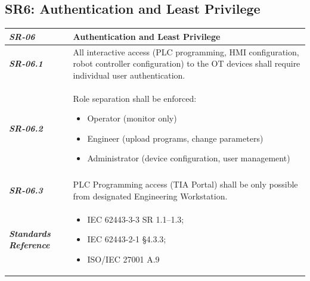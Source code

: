 \documentclass[11pt,a4paper]{article}
\begin{document}
\subsection{SR6: Authentication and Least Privilege}\label{SR6}
\begin{tabularx}{\textwidth}{>{\bfseries}p{2.5cm} X}
    \textit{SR-06} & \textbf{Authentication and Least Privilege} \vspace{0.5em}\\
\toprule
\textit{SR-06.1} &
    All interactive access (PLC programming, HMI configuration, robot controller configuration) to the OT devices shall require individual user authentication.
    \vspace{0.5em}
\\
\textit{SR-06.2} &
    Role separation shall be enforced:
    \begin{itemize}[label=-, noitemsep, topsep=0pt, leftmargin=*]
        \item Operator (monitor only)
        \item Engineer (upload programs, change parameters)
        \item Administrator (device configuration, user management)
    \end{itemize} \vspace{1em} \\ 
    \vspace{0.5em}
    \\
\textit{SR-06.3} &
    PLC Programming access (TIA Portal) shall be only possible from designated Engineering Workstation.
    \vspace{0.5em}
    \\
\midrule
    \textit{Standards Reference} &
\begin{itemize}[label=-, noitemsep, topsep=0pt, leftmargin=*]
    \item IEC 62443-3-3 SR 1.1–1.3; 
    \item IEC 62443-2-1 §4.3.3; 
    \item ISO/IEC 27001 A.9
\end{itemize} \vspace{1em} \\ 
\end{tabularx}
\vspace{2em}

\end{document}
